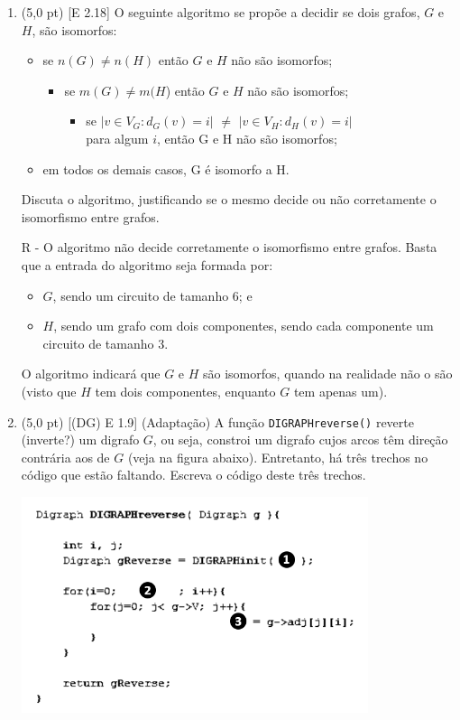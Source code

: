 \documentclass[12pt,a4paper,oneside]{article}
\begin{document}
\begin{enumerate}

	\item (5,0 pt) [E 2.18] O seguinte algoritmo se propõe a decidir se dois grafos, $G$ e $H$, são isomorfos:
		\begin{itemize}
			\item[] se $n(G) \not= n(H)$ então $G$ e $H$ não são isomorfos;
				\begin{itemize}
					\item[] se $m(G) \not= m(H$) então $G$ e $H$ não são isomorfos;
					\begin{itemize}
						\item[]  se $|{v \in V_G : d_G (v) = i}|$ $\not=$ $|{v \in V_H : d_H (v) = i}|$ \\
						para algum $i$, então G e H não são isomorfos;
					\end{itemize}
				\end{itemize}
			\item[] em todos os demais casos, G é isomorfo a H.
		\end{itemize}
		
	Discuta o algoritmo, justificando se o mesmo decide ou não corretamente o isomorfismo entre grafos. \\
	
	{\color{verde}
		R - O algoritmo não decide corretamente o isomorfismo entre grafos. Basta que a entrada do algoritmo seja formada por:
			\begin{itemize}
				\item $G$, sendo um circuito de tamanho 6; e
				\item $H$, sendo um grafo com dois componentes, sendo cada componente um circuito de tamanho 3.
			\end{itemize}			 
		O algoritmo indicará que $G$ e $H$ são isomorfos, quando na realidade não o são (visto que $H$ tem dois componentes, enquanto $G$ tem apenas um).
	}
	
	\newpage
	
	\item (5,0 pt) [(DG) E 1.9] (Adaptação) A função {\tt DIGRAPHreverse()} reverte (inverte?) um digrafo $G$, ou seja, constroi um digrafo cujos arcos têm direção contrária aos de $G$ (veja na figura abaixo). Entretanto, há três trechos no código que estão faltando. Escreva o código deste três trechos.
	\begin{center}
		\includegraphics[width=0.8\textwidth]{images/reverse2.png}
	\end{center}
	

\end{enumerate}
\end{document}
